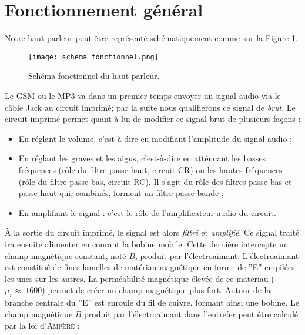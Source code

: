 

\section{Fonctionnement général}
Notre haut-parleur peut être représenté schématiquement comme sur la Figure \ref{block-diagram-hp}.

\begin{figure}[!htb]
	\centering
	\texttt{[image: schema\_fonctionnel.png]}
	\caption{Schéma fonctionnel du haut-parleur.}
	\label{block-diagram-hp}
\end{figure}

Le GSM ou le MP3 va dans un premier temps envoyer un signal audio via le câble Jack au circuit
imprimé; par la suite nous qualifierons ce signal de \textit{brut}. Le circuit imprimé permet
quant à lui de modifier ce signal brut de plusieurs façons : 

\begin{itemize}
	\item En réglant le volume, c'est-à-dire en modifiant l'amplitude du signal audio ;
	\item En réglant les graves et les aigus, c'est-à-dire en atténuant les basses fréquences
	(rôle du filtre passe-haut, circuit CR) ou les hautes
	fréquences (rôle du filtre passe-bas, circuit RC). Il s'agit du rôle des filtres passe-bas 
	et passe-haut qui,  combinés, forment un filtre passe-bande ;
	\item En amplifiant le signal : c'est le rôle de l'amplificateur audio du circuit.
\end{itemize}

À la sortie du circuit imprimé, le signal est alors \textit{filtré} et \textit{amplifié}.
Ce signal traité ira ensuite alimenter en courant la bobine mobile. Cette 
dernière intercepte un champ magnétique constant, noté $B$, produit par l'électroaimant.
L'électroaimant est constitué de fines lamelles de matériau magnétique en forme de ''E'' 
empilées les unes sur les autres. La perméabilité magnétique élevée de ce matériau
($\mu_r \approx \ 1600$) permet de créer un champ magnétique plus fort. Autour de la branche
centrale du ''E'' est enroulé du fil de cuivre, formant ainsi une bobine.
Le champ magnétique $B$ produit par l'électroaimant dans l'entrefer peut être calculé par la 
loi d'\textsc{Ampère} :


